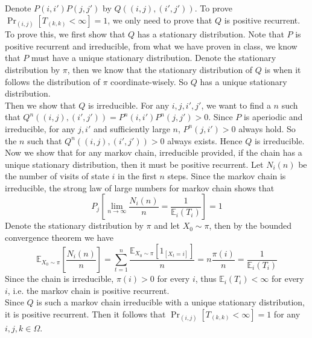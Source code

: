 \documentclass[12pt,letterpaper]{article}
\begin{document}
\subsection{}
Denote $P(i,i')P(j,j')$ by $Q((i,j),(i',j'))$.
To prove $\Pr_{(i,j)}[T_{(k,k)}<\infty]=1$,
we only need to prove that $Q$ is positive recurrent.\\
To prove this, we first show that $Q$ has a stationary distribution.
Note that $P$ is positive recurrent and irreducible,
from what we have proven in class,
we know that $P$ must have a unique stationary distribution.
Denote the stationary distribution by $\pi$,
then we know that the stationary distribution of $Q$ is when it follows the distribution of $\pi$ coordinate-wisely.
So $Q$ has a unique stationary distribution.\\
Then we show that $Q$ is irreducible. 
For any $i,j,i',j'$, we want to find a $n$ such that $Q^{n}((i,j),(i',j'))=P^{n}(i,i')P^{n}(j,j')>0$.
Since $P$ is aperiodic and irreducible, for any $j,i'$ and sufficiently large $n$,
$P^{n}(j,i')>0$ always hold.
So the $n$ such that $Q^{n}((i,j),(i',j'))>0$ always exists.
Hence $Q$ is irreducible.\\
Now we show that for any markov chain, irreducible provided,
if the chain has a unique stationary distribution,
then it must be positive recurrent.
Let $N_{i}(n)$ be the number of visits of state $i$ in the first $n$ steps.
Since the markov chain is irreducible, 
the strong law of large numbers for markov chain shows that 
$$P_{j}\left[\lim_{n\to\infty}\frac{N_{i}(n)}{n}=\frac{1}{\mathbb{E}_{i}(T_i)}\right]=1$$
Denote the stationary distribution by $\pi$ and let $X_0\sim\pi$,
then by the bounded convergence theorem we have
$$\mathbb{E}_{X_0\sim\pi}\left[\frac{N_i(n)}{n}\right]=\sum_{t=1}^{n}\frac{\mathbb{E}_{X_0\sim\pi}\left[1_{\left[X_t=i\right]}\right]}{n}=n\frac{\pi(i)}{n}=\frac{1}{\mathbb{E}_i(T_i)}$$
Since the chain is irreducible, $\pi(i)>0$ for every $i$,
thus $\mathbb{E}_i(T_i)<\infty$ for every $i$,
i.e. the markov chain is positive recurrent.\\
Since $Q$ is such a markov chain irreducible with a unique stationary distribution,
it is positive recurrent.
Then it follows that $\Pr_{(i,j)}[T_{(k,k)}<\infty]=1$ for any $i,j,k\in\Omega$.
\end{document}
